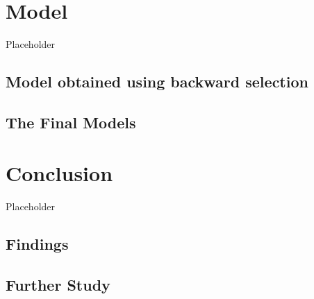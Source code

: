 \documentclass[12pt, oneside]{book}
\begin{document}
\hypertarget{model}{%
\chapter{Model}\label{model}}

Placeholder

\hypertarget{model-obtained-using-backward-selection}{%
\section{Model obtained using backward
selection}\label{model-obtained-using-backward-selection}}

\hypertarget{the-final-models}{%
\section{The Final Models}\label{the-final-models}}

\hypertarget{conclusion}{%
\chapter{Conclusion}\label{conclusion}}

Placeholder

\hypertarget{findings}{%
\section{Findings}\label{findings}}

\hypertarget{further-study}{%
\section{Further Study}\label{further-study}}


\end{document}
